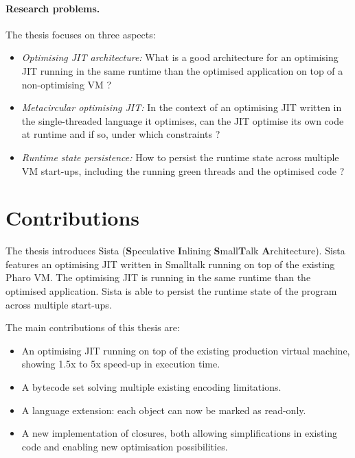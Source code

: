 \documentclass[a4paper,12pt,twoside]{../includes/ThesisStyle}
\begin{document}
\paragraph{Research problems.}The thesis focuses on three aspects:
\begin{itemize}
	\item \emph{Optimising JIT architecture:} {What is a good architecture for an optimising JIT running in the same runtime than the optimised application on top of a non-optimising VM ?}
	\item \emph{Metacircular optimising JIT:} In the context of an optimising JIT written in the single-threaded language it optimises, can the JIT optimise its own code at runtime and if so, under which constraints ?
	\item \emph{Runtime state persistence:} How to persist the runtime state across multiple VM start-ups, including the running green threads and the optimised code ?
\end{itemize}

\section{Contributions}

The thesis introduces Sista (\textbf{S}peculative \textbf{I}nlining \textbf{S}mall\textbf{T}alk \textbf{A}rchitecture). Sista features an optimising JIT written in Smalltalk running on top of the existing Pharo VM. The optimising JIT is running in the same runtime than the optimised application. Sista is able to persist the runtime state of the program across multiple start-ups. %

The main contributions of this thesis are:
\begin{itemize}
	\item An optimising JIT running on top of the existing production virtual machine, showing 1.5x to 5x speed-up in execution time.
	\item A bytecode set solving multiple existing encoding limitations.
	\item A language extension: each object can now be marked as read-only.
	\item A new implementation of closures, both allowing simplifications in existing code and enabling new optimisation possibilities.
\end{itemize}
\end{document}
